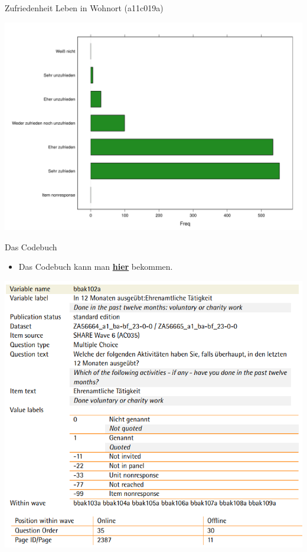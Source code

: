 \documentclass[ignorenonframetext,]{beamer}
\providecommand{\tightlist}{%
  \setlength{\itemsep}{0pt}\setlength{\parskip}{0pt}}
\begin{document}
\begin{frame}{Zufriedenheit Leben in Wohnort (a11c019a)}

\includegraphics{A3_GESISPanel_files/figure-beamer/unnamed-chunk-27-1.pdf}

\end{frame}

\begin{frame}{Das Codebuch}

\begin{itemize}
\tightlist
\item
  Das Codebuch kann man
  \href{https://www.gesis.org/gesis-panel/documentation/}{\textbf{hier}}
  bekommen.
\end{itemize}

\includegraphics{figure/cdb_bbak102a.PNG}

\end{frame}
\end{document}
